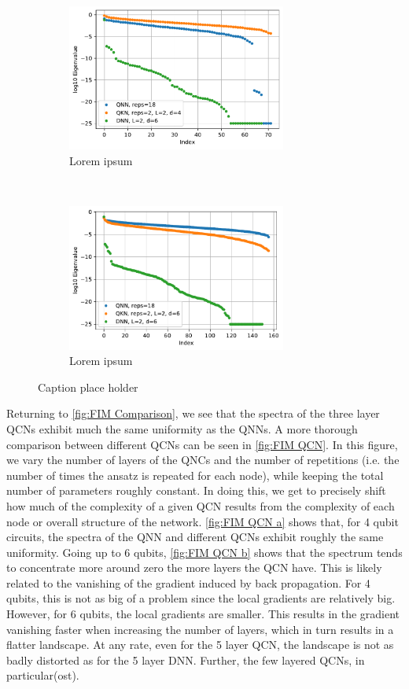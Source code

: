 \begin{figure}[H]
    \centering
    \begin{subfigure}[t]{0.5\textwidth}
        \centering
        \includegraphics[height=1.9in]{latex/figures/FIM_qubits_4.pdf}
        \caption{Lorem ipsum}
        
    \end{subfigure}%
    ~ 
    \begin{subfigure}[t]{0.5\textwidth}
        \centering
        \includegraphics[height=1.9in]{latex/figures/FIM_qubits_6.pdf}
        \caption{Lorem ipsum}
    \end{subfigure}
    \caption{Caption place holder}
    \label{fig:FIM Comparison}
\end{figure}

Returning to \autoref{fig:FIM Comparison}, we see that the spectra of the three layer QCNs exhibit much the same uniformity as the QNNs. A more thorough comparison between different QCNs can be seen in \autoref{fig:FIM QCN}. In this figure, we vary the number of layers of the QNCs and the number of repetitions (i.e. the number of times the ansatz is repeated for each node), while keeping the total number of parameters roughly constant. In doing this, we get to precisely shift how much of the complexity of a given QCN results from the complexity of each node or overall structure of the network. \autoref{fig:FIM QCN a} shows that, for 4 qubit circuits, the spectra of the QNN and different QCNs exhibit roughly the same uniformity. Going up to 6 qubits,  \autoref{fig:FIM QCN b} shows that the spectrum tends to concentrate more around zero the more layers the QCN have. This is likely related to the vanishing of the gradient induced by back propagation. For 4 qubits, this is not as big of a problem since the local gradients are relatively big. However, for 6 qubits, the local gradients are smaller. This results in the gradient vanishing faster when increasing the number of layers, which in turn results in a flatter landscape. At any rate, even for the 5 layer QCN, the landscape is not as badly distorted as for the 5 layer DNN. Further, the few layered QCNs, in particular(ost). 


